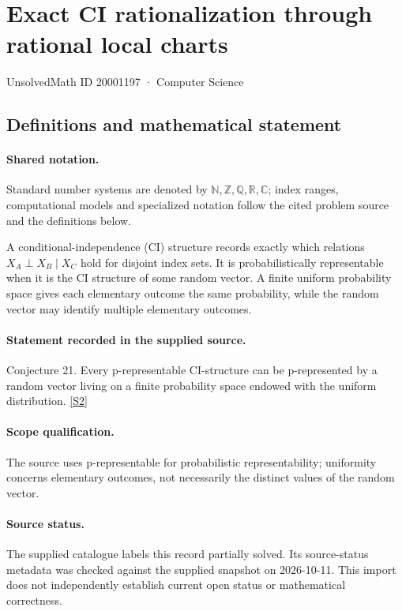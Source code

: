 \documentclass[11pt]{article}
\newcommand{\sref}[2]{\hyperlink{source:#1:#2}{[S#2]}}
\begin{document}
\setcounter{section}{20001196}
\section{Exact CI rationalization through rational local charts}\label{20001197}
{\small\sffamily UnsolvedMath ID 20001197 · Computer Science}
\subsection{Definitions and mathematical statement}

\paragraph{Shared notation.}Standard number systems are denoted by $\mathbb N,\mathbb Z,\mathbb Q,\mathbb R,\mathbb C$; index ranges, computational models and specialized notation follow the cited problem source and the definitions below.


A conditional-independence (CI) structure records exactly which relations $X_A\perp X_B\mid X_C$ hold for disjoint index sets. It is probabilistically representable when it is the CI structure of some random vector. A finite uniform probability space gives each elementary outcome the same probability, while the random vector may identify multiple elementary outcomes.
\paragraph{Statement recorded in the supplied source.}
Conjecture 21. Every p-representable CI-structure can be p-represented by a random vector living on a finite probability space endowed with the uniform distribution. \sref{20001197}{2}
\paragraph{Scope qualification.}
The source uses p-representable for probabilistic representability; uniformity concerns elementary outcomes, not necessarily the distinct values of the random vector.
\paragraph{Source status.}
The supplied catalogue labels this record partially solved. Its source-status metadata was checked against the supplied snapshot on 2026-10-11. This import does not independently establish current open status or mathematical correctness.
\end{document}
